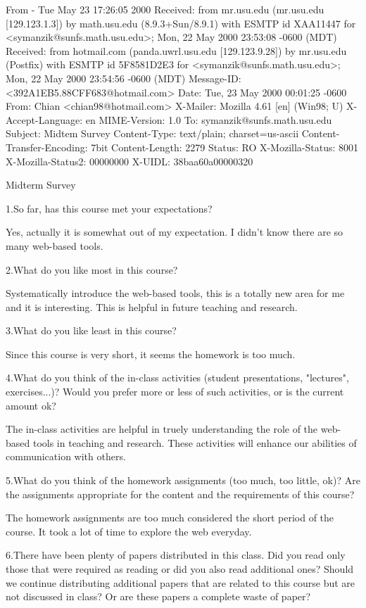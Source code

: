 From - Tue May 23 17:26:05 2000
Received: from mr.usu.edu (mr.usu.edu [129.123.1.3])
	by math.usu.edu (8.9.3+Sun/8.9.1) with ESMTP id XAA11447
	for <symanzik@sunfs.math.usu.edu>; Mon, 22 May 2000 23:53:08 -0600 (MDT)
Received: from hotmail.com (panda.uwrl.usu.edu [129.123.9.28])
	by mr.usu.edu (Postfix) with ESMTP id 5F8581D2E3
	for <symanzik@sunfs.math.usu.edu>; Mon, 22 May 2000 23:54:56 -0600 (MDT)
Message-ID: <392A1EB5.88CFF683@hotmail.com>
Date: Tue, 23 May 2000 00:01:25 -0600
From: Chian <chian98@hotmail.com>
X-Mailer: Mozilla 4.61 [en] (Win98; U)
X-Accept-Language: en
MIME-Version: 1.0
To: symanzik@sunfs.math.usu.edu
Subject: Midtem Survey
Content-Type: text/plain; charset=us-ascii
Content-Transfer-Encoding: 7bit
Content-Length: 2279
Status: RO
X-Mozilla-Status: 8001
X-Mozilla-Status2: 00000000
X-UIDL: 38baa60a00000320



    Midterm Survey

  1.So far, has this course met your expectations?

    Yes, actually it is somewhat out of my expectation. I didn't know
there are so many web-based tools.

  2.What do you like most in this course?

    Systematically introduce the web-based tools, this is a totally new
area for me and it is interesting.
    This is helpful in future teaching and research.

  3.What do you like least in this course?

    Since this course is very short, it seems the homework is too much.

  4.What do you think of the in-class activities (student presentations,
"lectures", exercises...)? Would you prefer more or less of such
activities, or is the
    current amount ok?

    The in-class activities are helpful in truely understanding the role
of the web-based tools in teaching and research.
    These activities will enhance our abilities of communication with
others.

  5.What do you think of the homework assignments (too much, too little,
ok)? Are the assignments appropriate for the content and the
requirements of this
    course?

    The homework assignments are too much considered the short period of
the course. It took a lot of time to explore the web everyday.

  6.There have been plenty of papers distributed in this class. Did you
read only those that were required as reading or did you also read
additional ones?
    Should we continue distributing additional papers that are related
to this course but are not discussed in class? Or are these papers a
complete waste of
    paper?

